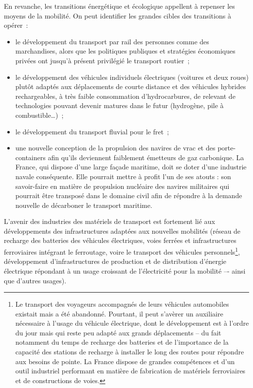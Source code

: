 \documentclass[a4paper]{article}
\begin{document}
En revanche, les transitions énergétique et écologique appellent à repenser les moyens de la mobilité. On peut identifier les grandes cibles des transitions à opérer~:
\begin{itemize}
\item le développement du transport par rail des personnes comme des marchandises, alors que les politiques publiques et stratégies économiques privées ont jusqu’à présent privilégié le transport routier~;
\item le développement des véhicules individuels électriques (voitures et deux roues) plutôt adaptés aux déplacements de courte distance et des véhicules hybrides rechargeables, à très faible consommation d’hydrocarbures, de relevant de technologies pouvant devenir matures dans le futur (hydrogène, pile à combustible…)~;
\item le développement du transport fluvial pour le fret~;
\item une nouvelle conception de la propulsion des navires de vrac et des porte-containers afin qu’ils deviennent faiblement émetteurs de gaz carbonique. La France, qui dispose d’une large façade maritime, doit se doter d’une industrie navale conséquente. Elle pourrait mettre à profit l’un de ses atouts : son savoir-faire en matière de propulsion nucléaire des navires militaires qui pourrait être transposé dans le domaine civil afin de répondre à la demande nouvelle de décarboner le transport maritime.

\end{itemize}

L’avenir des industries des matériels de transport est fortement lié aux développements des infrastructures adaptées aux nouvelles mobilités (réseau de recharge des batteries des véhicules électriques, voies ferrées et infrastructures ferroviaires intégrant le ferroutage, voire le transport des véhicules personnels\footnote{Le transport des voyageurs accompagnés de leurs véhicules automobiles existait mais a été abandonné. Pourtant, il peut s’avèrer un auxiliaire nécessaire à l’usage du véhicule électrique, dont le développement est à l’ordre du jour mais qui reste peu adapté aux grands déplacements – du fait notamment du temps de recharge des batteries et de l’importance de la capacité des stations de recharge à installer le long des routes pour répondre aux besoins de pointe. La France dispose de grandes compétences et d’un outil industriel performant en matière de fabrication de matériels ferroviaires et de constructions de voies.}, développement d’infrastructures de production et de distribution d’énergie électrique répondant à un usage croissant de l’électricité pour la mobilité –- ainsi que d’autres usages).
\end{document}
